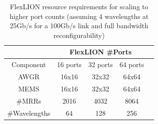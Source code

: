 \begin{table}[]
\centering
\caption{FlexLION resource requirements for scaling to higher port counts (assuming 4 wavelengths at 25Gb/s for a 100Gb/s link and full bandwidth reconfigurability)}
\label{fig:flexscale}
\begin{tabular}{@{}c|cccc@{}}
\toprule
              & \multicolumn{3}{c}{FlexLION \#Ports} &  \\ \midrule
 Component             & 16 ports         & 32 ports        & 64 ports       &  \\ \midrule
AWGR          & 16x16      & 32x32      & 64x64     &  \\
MEMS          & 16x16      & 32x32      & 64x64     &  \\
\#MRRs         & 2016       & 4032       & 8064      &  \\
\#Wavelengths & 64         & 128        & 256       &  \\ \bottomrule
\end{tabular}
\end{table}
